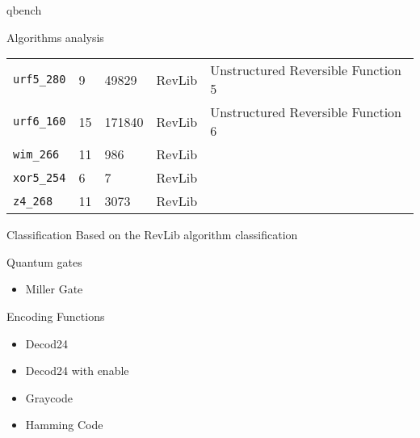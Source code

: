 \documentclass[11pt]{beamer}
\begin{document}
\begin{frame}[fragile,label={sec:org639c711}]{qbench}
\begin{block}{Algorithms analysis}
\begin{table}[htbp]
\begin{tabular}{|p{3cm}|p{1.5cm}|p{1cm}|p{1cm}|p{7.5cm}|}
\texttt{urf5\_280} & 9 & 49829 & RevLib & Unstructured Reversible Function 5\\
\texttt{urf6\_160} & 15 & 171840 & RevLib & Unstructured Reversible Function 6\\
\texttt{wim\_266} & 11 & 986 & RevLib & \\
\texttt{xor5\_254} & 6 & 7 & RevLib & \\
\texttt{z4\_268} & 11 & 3073 & RevLib & \\
\hline
\end{tabular}
\end{table}


\begin{block}{Classification}
Based on the RevLib algorithm classification

\begin{center}    
\end{center}

\begin{block}{Quantum gates}
\begin{itemize}
\item Miller Gate
\end{itemize}
\end{block}

\begin{block}{Encoding Functions}
\begin{itemize}
\item Decod24
\item Decod24 with enable
\item Graycode
\item Hamming Code
\end{itemize}
\end{block}


\end{block}
\end{block}
\end{frame}
\end{document}
